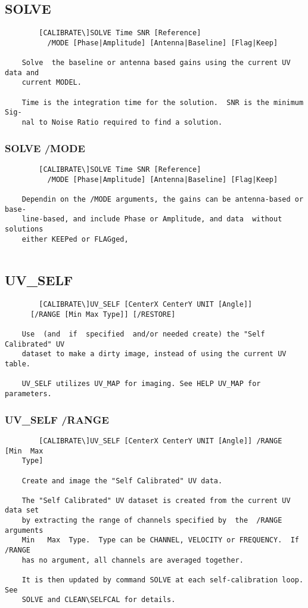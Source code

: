 \subsection{SOLVE}
\begin{verbatim}
        [CALIBRATE\]SOLVE Time SNR [Reference]
          /MODE [Phase|Amplitude] [Antenna|Baseline] [Flag|Keep]

    Solve  the baseline or antenna based gains using the current UV data and
    current MODEL.

    Time is the integration time for the solution.  SNR is the minimum  Sig-
    nal to Noise Ratio required to find a solution.

\end{verbatim}
\subsubsection{SOLVE /MODE}
\begin{verbatim}
        [CALIBRATE\]SOLVE Time SNR [Reference]
          /MODE [Phase|Amplitude] [Antenna|Baseline] [Flag|Keep]

    Dependin on the /MODE arguments, the gains can be antenna-based or base-
    line-based, and include Phase or Amplitude, and data  without  solutions
    either KEEPed or FLAGged,


\end{verbatim}
\subsection{UV\_SELF}
\begin{verbatim}
        [CALIBRATE\]UV_SELF [CenterX CenterY UNIT [Angle]]
      [/RANGE [Min Max Type]] [/RESTORE]

    Use  (and  if  specified  and/or needed create) the "Self Calibrated" UV
    dataset to make a dirty image, instead of using the current UV table.

    UV_SELF utilizes UV_MAP for imaging. See HELP UV_MAP for parameters.

\end{verbatim}
\subsubsection{UV\_SELF /RANGE}
\begin{verbatim}
        [CALIBRATE\]UV_SELF [CenterX CenterY UNIT [Angle]] /RANGE  [Min  Max
    Type]

    Create and image the "Self Calibrated" UV data.

    The "Self Calibrated" UV dataset is created from the current UV data set
    by extracting the range of channels specified by  the  /RANGE  arguments
    Min   Max  Type.  Type can be CHANNEL, VELOCITY or FREQUENCY.  If /RANGE
    has no argument, all channels are averaged together.

    It is then updated by command SOLVE at each self-calibration loop.   See
    SOLVE and CLEAN\SELFCAL for details.

\end{verbatim}
